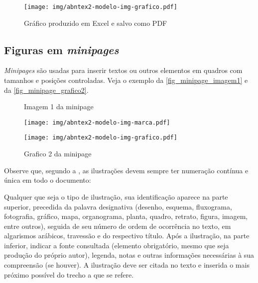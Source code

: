 \begin{figure}[htb]
	\caption{\label{fig_grafico}Gráfico produzido em Excel e salvo como PDF}
	\begin{center}
	    \texttt{[image: img/abntex2-modelo-img-grafico.pdf]}
	\end{center}
\end{figure}

\subsection{Figuras em \emph{minipages}}
\emph{Minipages} são usadas para inserir textos ou outros elementos em quadros com tamanhos e posições controladas. Veja o exemplo da \autoref{fig_minipage_imagem1} e da \autoref{fig_minipage_grafico2}.

\begin{figure}[htb]
 \label{teste}
 \centering
  \begin{minipage}{0.4\textwidth}
    \centering
    \caption{Imagem 1 da minipage} \label{fig_minipage_imagem1}
    \texttt{[image: img/abntex2-modelo-img-marca.pdf]}
  \end{minipage}
  \hfill
  \begin{minipage}{0.4\textwidth}
    \centering
    \caption{Grafico 2 da minipage} \label{fig_minipage_grafico2}
    \texttt{[image: img/abntex2-modelo-img-grafico.pdf]}
  \end{minipage}
\end{figure}

Observe que, segundo a , as ilustrações devem sempre ter numeração contínua e única em todo o documento:

\begin{citacao}
  Qualquer que seja o tipo de ilustração, sua identificação aparece na parte superior, precedida da palavra designativa (desenho, esquema, fluxograma, fotografia, gráfico, mapa, organograma, planta, quadro, retrato, figura, imagem, entre outros), seguida de seu número de ordem de ocorrência no texto, em algarismos arábicos, travessão e do respectivo título. Após a ilustração, na parte inferior, indicar a fonte consultada (elemento obrigatório, mesmo que seja produção do próprio autor), legenda, notas e outras informações necessárias à sua compreensão (se houver). A ilustração deve ser citada no texto e inserida o mais próximo possível do trecho a que se refere. \cite[seções 5.8]{NBR14724:2011}
\end{citacao}

